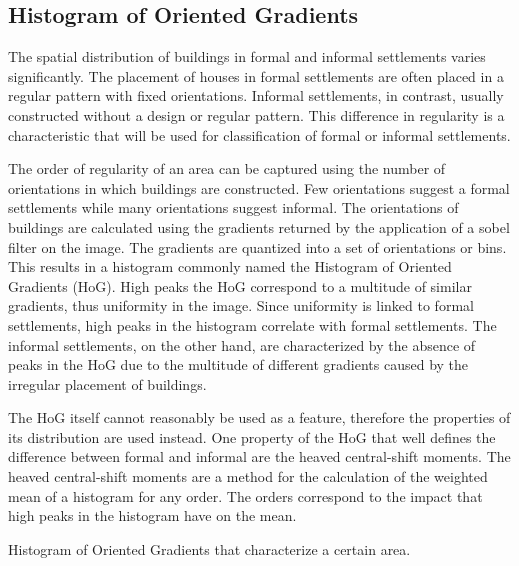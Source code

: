 \subsection{Histogram of Oriented Gradients}
The spatial distribution of buildings in formal and informal settlements varies
significantly. The placement of houses in formal settlements are often placed
in a regular pattern with fixed orientations. Informal settlements, in
contrast, usually constructed without a design or regular pattern. This
difference in regularity is a characteristic that will be used
for classification of formal or informal settlements.

The order of regularity of an area can be captured using the number of
orientations in which buildings are constructed. Few orientations suggest
a formal settlements while many orientations suggest informal. The orientations
of buildings are calculated using the gradients returned by the application of
a sobel filter on the image. The gradients are quantized into a set of
orientations or bins. This results in a histogram commonly named the Histogram
of Oriented Gradients (HoG). High peaks the HoG correspond to a multitude of
similar gradients, thus uniformity in the image. Since uniformity is linked
to formal settlements, high peaks in the histogram correlate with formal
settlements. The informal settlements, on the other hand, are characterized by
the absence of peaks in the HoG due to the multitude of different gradients
caused by the irregular placement of buildings.

The HoG itself cannot reasonably be used as a feature, therefore the properties
of its distribution are used instead. One property of the HoG that well defines the
difference between formal and informal are the heaved central-shift moments.
The heaved central-shift moments are a method for the calculation of the
weighted mean of a histogram for any order.  The orders correspond to the
impact that high peaks in the histogram have on the mean. 


Histogram of Oriented Gradients
that characterize a certain area.



